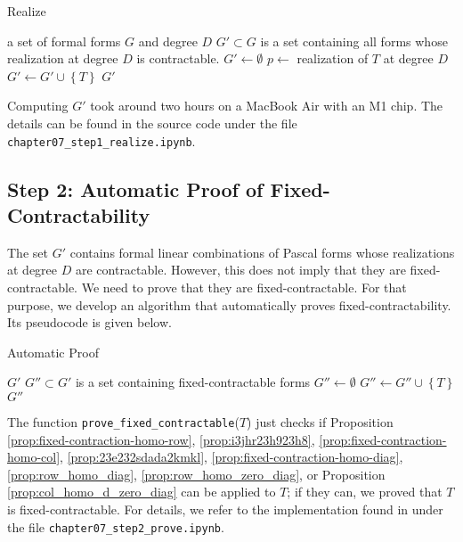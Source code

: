 \begin{algorithm}[H]
    \caption{Realize}
    \label{alg:realize}
    \begin{algorithmic}[1]
    \Require a set of formal forms $G$ and degree \( D \)
\Ensure $G' \subset G$ is a set containing all forms whose realization at degree \( D \) is contractable.
    \State \( G' \gets \emptyset \)
        \State \( p \gets  \) realization of \( T \) at degree \( D \)
            \State $G' \gets G' \cup \left\{ T \right\}$
        \EndIf        
    \EndFor
    \State \Return $G'$
\EndFunction
\end{algorithmic}
\end{algorithm}

Computing \( G' \) took around two hours on a MacBook Air with an M1 chip. The details can be found in the source code \cite{ducrepo} under the file \texttt{chapter07\_step1\_realize.ipynb}.

\subsection*{Step 2: Automatic Proof of Fixed-Contractability}

The set \( G' \) contains formal linear combinations of Pascal forms whose realizations at degree \( D \) are contractable. However, this does not imply that they are fixed-contractable. We need to prove that they are fixed-contractable. For that purpose, we develop an algorithm that automatically proves fixed-contractability. Its pseudocode is given below.

\begin{algorithm}[H]
    \caption{Automatic Proof}
    \label{alg:autoproof}
    \begin{algorithmic}[1]
    \Require $G'$
\Ensure $G'' \subset G'$ is a set containing fixed-contractable forms
    \State \( G'' \gets \emptyset \)
            \State $G'' \gets G'' \cup \left\{ T \right\}$
        \EndIf        
    \EndFor
    \State \Return $G''$
\EndFunction
\end{algorithmic}
\end{algorithm}
The function \texttt{prove\_fixed\_contractable}($T$) just checks if Proposition \ref{prop:fixed-contraction-homo-row}, \ref{prop:i3jhr23h923h8}, \ref{prop:fixed-contraction-homo-col}, \ref{prop:23e232sdada2kmkl}, \ref{prop:fixed-contraction-homo-diag}, \ref{prop:row_homo_diag}, \ref{prop:row_homo_zero_diag}, or Proposition \ref{prop:col_homo_d_zero_diag} can be applied to \( T \); if they can, we proved that \( T \) is fixed-contractable. For details, we refer to the implementation found in \cite{ducrepo} under the file \texttt{chapter07\_step2\_prove.ipynb}. 



